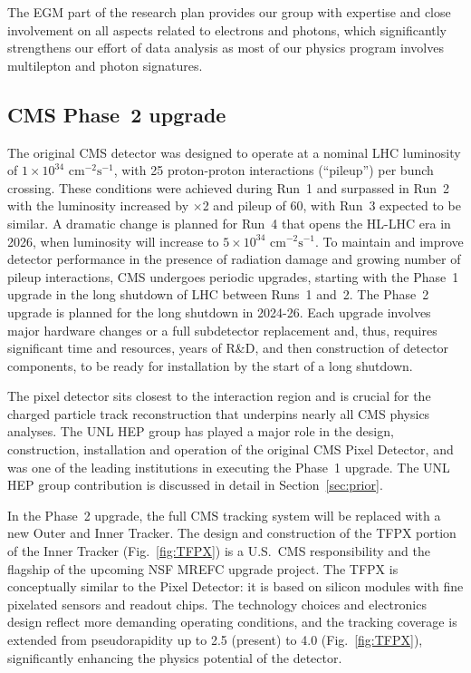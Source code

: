 The EGM part of the research plan provides our group with expertise and close involvement on all aspects related to electrons and photons, which significantly strengthens our effort of data analysis as most of our physics program involves multilepton and photon signatures.


\subsection{CMS Phase~2 upgrade}


The original CMS detector was designed to operate at a nominal LHC luminosity of $1\!\times\! 10^{34}\textrm{ cm}^{-2}\textrm{s}^{-1}$, with 25 proton-proton interactions (``pileup'') per bunch crossing. These conditions were achieved during Run~1 and surpassed in Run~2 with the luminosity increased by $\times$2 and pileup of 60, with Run~3 expected to be similar. A dramatic change is planned for Run~4 that opens the HL-LHC era in 2026, when luminosity will increase to $5\!\times\! 10^{34}\textrm{ cm}^{-2}\textrm{s}^{-1}$. To maintain and improve detector performance in the presence of radiation damage and growing number of pileup interactions, CMS undergoes periodic upgrades, starting with the Phase~1 upgrade in the long shutdown of LHC between Runs~1 and~2. The Phase~2 upgrade is planned for the long shutdown in 2024-26. Each upgrade involves major hardware changes or a full subdetector replacement and, thus, requires significant time and resources, years of R\&D, and then construction of detector components, to be ready for installation by the start of a long shutdown.

The pixel detector sits closest to the interaction region and is crucial for the charged particle track reconstruction that underpins nearly all CMS physics analyses. The UNL HEP group has played a major role in the design, construction, installation and operation of the original CMS Pixel Detector, and was one of the leading institutions in executing the Phase~1 upgrade. The UNL HEP group contribution is discussed in detail in Section~\ref{sec:prior}. 

In the Phase~2 upgrade, the full CMS tracking system will be replaced with a new Outer and Inner Tracker\cite{bib:Phase2TDR}. The design and construction of the TFPX portion of the Inner Tracker (Fig.~\ref{fig:TFPX}) is a U.S.~CMS responsibility and the flagship of the upcoming NSF MREFC upgrade project.  The TFPX is conceptually similar to the Pixel Detector: it is based on silicon modules with fine pixelated sensors and readout chips. The technology choices and electronics design reflect more demanding operating conditions, and the tracking coverage is extended from pseudorapidity up to 2.5 (present) to 4.0 (Fig.~\ref{fig:TFPX}), significantly enhancing the physics potential of the detector. 


